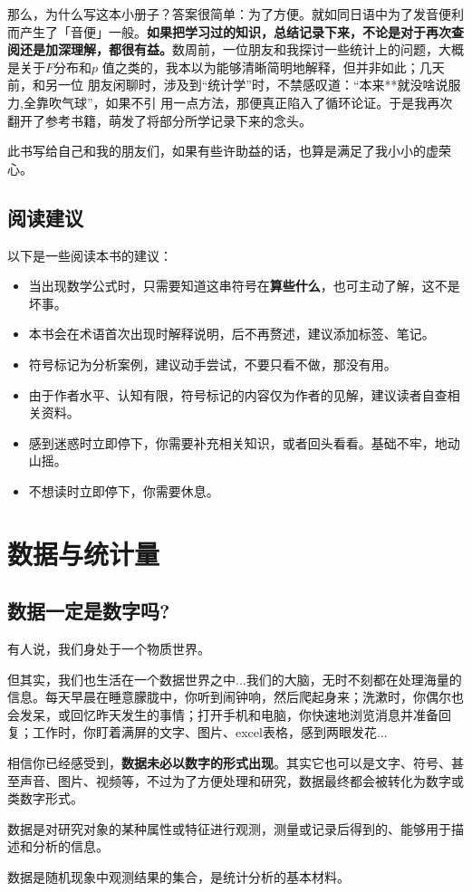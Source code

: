 \documentclass[lang=cn,10pt]{elegantbook}
\begin{document}
那么，为什么写这本小册子？答案很简单：为了方便。就如同日语中为了发音便利
而产生了「音便」一般。\textbf{如果把学习过的知识，总结记录下来，不论是对于再次查阅还是加深理解，都很有益。}数周前，一位朋友和我探讨一些统计上的问题，大概是关于$F$分布和$p$
值之类的，我本以为能够清晰简明地解释，但并非如此；几天前，和另一位
朋友闲聊时，涉及到“统计学”时，不禁感叹道：“本来**就没啥说服力,全靠吹气球”，如果不引
用一点方法，那便真正陷入了循环论证。于是我再次翻开了参考书籍，萌发了将部分所学记录下来的念头。

此书写给自己和我的朋友们，如果有些许助益的话，也算是满足了我小小的虚荣心。


\section{阅读建议}
以下是一些阅读本书的建议：
\begin{itemize}
  \item 当出现数学公式时，只需要知道这串符号在\textbf{算些什么}，也可主动了解，这不是坏事。
  \item 本书会在术语首次出现时解释说明，后不再赘述，建议添加标签、笔记。
  \item 符号标记为分析案例，建议动手尝试，不要只看不做，那没有用。
  \item 由于作者水平、认知有限，符号标记的内容仅为作者的见解，建议读者自查相关资料。
  \item 感到迷惑时立即停下，你需要补充相关知识，或者回头看看。基础不牢，地动山摇。
  \item 不想读时立即停下，你需要休息。
\end{itemize}






\chapter{数据与统计量}
\section{数据一定是数字吗?}
有人说，我们身处于一个物质世界。

但其实，我们也生活在一个数据世界之中...我们的大脑，无时不刻都在处理海量的信息。每天早晨在睡意朦胧中，你听到闹钟响，然后爬起身来；洗漱时，你偶尔也会发呆，或回忆昨天发生的事情；打开手机和电脑，你快速地浏览消息并准备回复；工作时，你盯着满屏的文字、图片、excel表格，感到两眼发花...

相信你已经感受到，\textbf{数据未必以数字的形式出现}。其实它也可以是文字、符号、甚至声音、图片、视频等，不过为了方便处理和研究，数据最终都会被转化为数字或类数字形式。
\begin{definition}[数据] 
数据是对研究对象的某种属性或特征进行观测，测量或记录后得到的、能够用于描述和分析的信息。

数据是随机现象中观测结果的集合，是统计分析的基本材料。
\end{definition}
\end{document}
